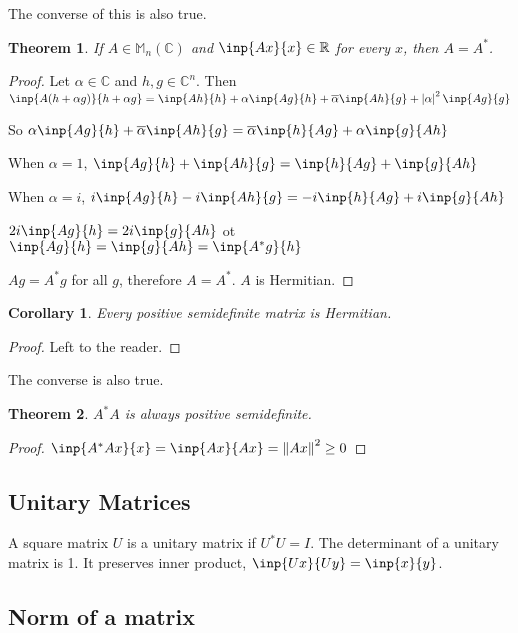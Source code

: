 \documentclass[twofold]{article}
\newcommand*\conj[1]{\overline{#1}}
\newcommand*\adj[1]{#1^*}
\newcommand*\norm[1]{\left \Vert #1 \right\Vert}
\newcommand*\abs[1]{\left \vert #1 \right\vert}
\theoremstyle{plain}
\newtheorem*{theorem}{Theorem}
\newtheorem*{corollary}{Corollary}
\theoremstyle{definition}
\begin{document}
The converse of this is also true. 
\begin{theorem} If \(A \in \mathbb{M}_n (\mathbb{C})\) and \(\inp{Ax}{x} \in \mathbb{R}\) for every \(x\), then \(A = \adj{A}\). \end{theorem}

\begin{proof} Let \(\alpha \in \mathbb{C}\) and \(h, g \in \mathbb{C}^n\). Then
\(\inp{A(h + \alpha g)}{h + \alpha g} = \inp{Ah}{h} + \alpha \inp{Ag}{h} + \conj{\alpha} \inp{Ah}{g} + \abs{\alpha}^2 \inp{Ag}{g} \)

So \(\alpha \inp{Ag}{h} + \conj{\alpha} \inp{Ah}{g} = \conj{\alpha} \inp{h}{Ag} + \alpha \inp{g}{Ah} \)

When \(\alpha = 1\), \(\inp{Ag}{h} + \inp{Ah}{g} = \inp{h}{Ag} + \inp{g}{Ah}\)\

When \(\alpha = i\), \(i \inp{Ag}{h} - i \inp{Ah}{g} = -i \inp{h}{Ag} + i \inp{g}{Ah}\)

\(2i \inp{Ag}{h} = 2i \inp{g}{Ah}\) ot \(\inp{Ag}{h} = \inp{g}{Ah} = \inp{\adj{A}g}{h}\)

\(Ag = \adj{A}g\) for all \(g\), therefore \(A = \adj{A}\). \(A\) is Hermitian.
 \end{proof}

\begin{corollary}Every positive semidefinite matrix is Hermitian.\end{corollary}
\begin{proof} Left to the reader. \end{proof}

The converse is also true.
\begin{theorem} \(\adj{A} A\) is always positive semidefinite. \end{theorem}

\begin{proof} \(\inp{\adj{A} A x}{ x} = \inp{Ax}{Ax} = \norm{Ax}^2 \ge 0\)\end{proof}




\subsection{Unitary Matrices}

A square matrix \(U\) is a unitary matrix if \(\adj{U} U = I\). The determinant of a unitary matrix is 1. It preserves inner product, \(\inp{Ux}{Uy} = \inp{x}{y}\).

\subsection{Norm of a matrix}
\end{document}
